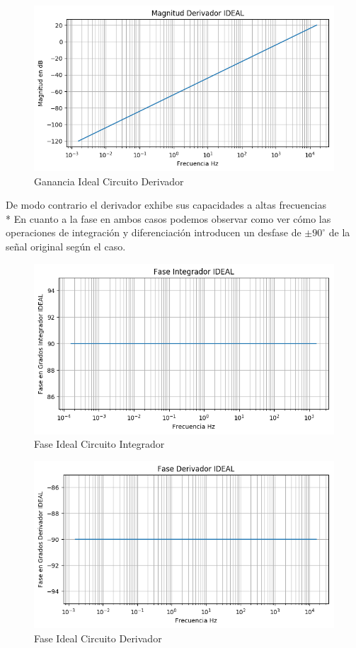 \documentclass[a4paper]{article}
\begin{document}
\begin{figure}[H]
	\centering
	\includegraphics[width=\textwidth]{Ejercicio4/BODE-IDEAL-MAGNITUD-DERIVADOR.png}
	\caption{Ganancia Ideal Circuito Derivador}
\end{figure}
De modo contrario el derivador exhibe sus capacidades a altas frecuencias
\\*
En cuanto a la fase en ambos casos podemos observar como ver cómo las operaciones de integración y diferenciación introducen un desfase de $\pm90^{\circ}$ de la señal original según el caso. 
\begin{figure}[H]
	\centering
	\includegraphics[width=\textwidth]{Ejercicio4/BODE-IDEAL-FASE-INTEGRADOR.png}
	\caption{Fase Ideal Circuito Integrador}
\end{figure}

\begin{figure}[H]
	\includegraphics[width=\textwidth]{Ejercicio4/BODE-IDEAL-FASE-DERIVADOR.png}
	\caption{Fase Ideal Circuito Derivador}
\end{figure}
\end{document}
